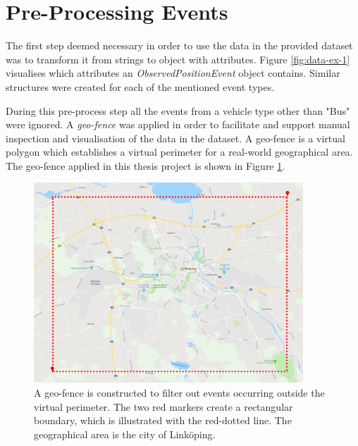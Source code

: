 \section{Pre-Processing Events}
The first step deemed necessary in order to use the data in the provided dataset was to transform it from strings to object with attributes.
Figure \ref{fig:data-ex-1} visualises which attributes an \textit{ObservedPositionEvent} object contains.
Similar structures were created for each of the mentioned event types.

During this pre-process step all the events from a vehicle type other than "Bus" were ignored.
A \textit{geo-fence} was applied in order to facilitate and support manual inspection and visualisation of the data in the dataset.
A geo-fence is a virtual polygon which establishes a virtual perimeter for a real-world geographical area.
The geo-fence applied in this thesis project is shown in Figure \ref{fig:geo-fence}.

\begin{figure}[ht!]
    \centering
    \includegraphics[width=0.9\textwidth]{figures/geofencing_linkoping}
    \caption{A geo-fence is constructed to filter out events occurring outside the virtual perimeter.
    The two red markers create a rectangular boundary, which is illustrated with the red-dotted line.
    The geographical area is the city of Linköping.}
    \label{fig:geo-fence}
\end{figure}

